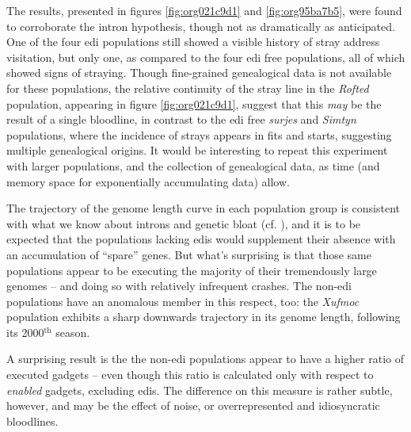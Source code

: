 \documentclass[12pt,glossary]{dalthesis}
\begin{document}
The results, presented in figures \ref{fig:org021c9d1} and
\ref{fig:org95ba7b5}, were found to corroborate the intron hypothesis,
though not as dramatically as anticipated. One of the four \gls{edi} populations
still showed a visible history of stray address visitation, but only one, as
compared to the four \gls{edi} free populations, all of which showed signs of
straying. Though fine-grained genealogical data is not available for these
populations, the relative continuity of the stray line in the \emph{Rofted} population, 
appearing in figure \ref{fig:org021c9d1}, suggest that this \emph{may} be the
result of a single bloodline, in contrast to the \gls{edi} free \emph{surjes} and 
\emph{Simtyn} populations, where the incidence of strays appears in fits and starts, 
suggesting multiple genealogical origins. It would be interesting to repeat this
experiment with larger populations, and the collection of genealogical data, 
as time (and memory space for exponentially accumulating data) allow. 

The trajectory of the genome length curve in each population group is consistent
with what we know about introns and genetic bloat (cf. \cite{banzhaf98}), and
it is to be expected that the populations lacking \glspl{edi} would supplement
their absence with an accumulation of ``spare'' genes. But what's surprising is
that those same populations appear to be executing the majority of their
tremendously large genomes -- and doing so with relatively infrequent crashes. 
The non-\gls{edi} populations have an anomalous member in this respect, too:
the \emph{Xufmoc} population exhibits a sharp downwards trajectory in its genome
length, following its 2000\(^{\text{th}}\) season.  

A surprising result is the the non-\gls{edi} populations appear to have a higher
ratio of executed gadgets -- even though this ratio is calculated only with respect
to \emph{enabled} gadgets, excluding \glspl{edi}. The difference on this measure is rather
subtle, however, and may be the effect of noise, or overrepresented and idiosyncratic
bloodlines. 
\end{document}

